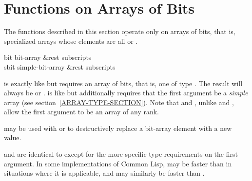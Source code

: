 \section{Functions on Arrays of Bits}

The functions described in this section operate only
on arrays of bits, that is, specialized arrays whose elements
are all  or .

\begin{defun}[Function]
bit bit-array &rest subscripts \\
sbit simple-bit-array &rest subscripts

 is exactly like  but requires an array of bits,
that is, one of type .
The result will always be  or .
 is like  but additionally requires that the first
argument be a \emph{simple} array (see section~\ref{ARRAY-TYPE-SECTION}).
Note that  and , unlike  and ,
allow the first argument to be an array of any rank.

 may be used with  or  to destructively replace
a bit-array element with a new value.

 and  are identical to  except for the
more specific type requirements on the first argument.
In some implementations of Common Lisp,
 may be faster than  in situations where it is applicable,
and  may similarly be faster than .
\end{defun}

